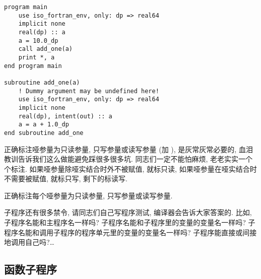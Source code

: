 \begin{lstlisting} 
program main
    use iso_fortran_env, only: dp => real64
    implicit none
    real(dp) :: a
    a = 10.0_dp
    call add_one(a)
    print *, a
end program main

subroutine add_one(a)
    ! Dummy argument may be undefined here!
    use iso_fortran_env, only: dp => real64
    implicit none
    real(dp), intent(out) :: a
    a = a + 1.0_dp
end subroutine add_one
\end{lstlisting} 

正确标注哑参量为只读参量, 只写参量或读写参量\label{arguments} (加 ), 是灰常灰常必要的, 血泪教训告诉我们这么做能避免踩很多很多坑. 同志们一定不能怕麻烦, 老老实实一个个标注. 如果哑参量除哑实结合时外不被赋值, 就标只读, 如果哑参量在哑实结合时不需要被赋值, 就标只写, 剩下的标读写. 
\begin{convention} 
    正确标注每个哑参量为只读参量, 只写参量或读写参量. 
\end{convention} 

子程序还有很多禁令, 请同志们自己写程序测试, 编译器会告诉大家答案的. 比如, 子程序名能和主程序名一样吗? 子程序名能和子程序里的变量的变量名一样吗? 子程序名能和调用子程序的程序单元里的变量的变量名一样吗? 子程序能直接或间接地调用自己吗?\dots{}

\subsection{函数子程序} 

